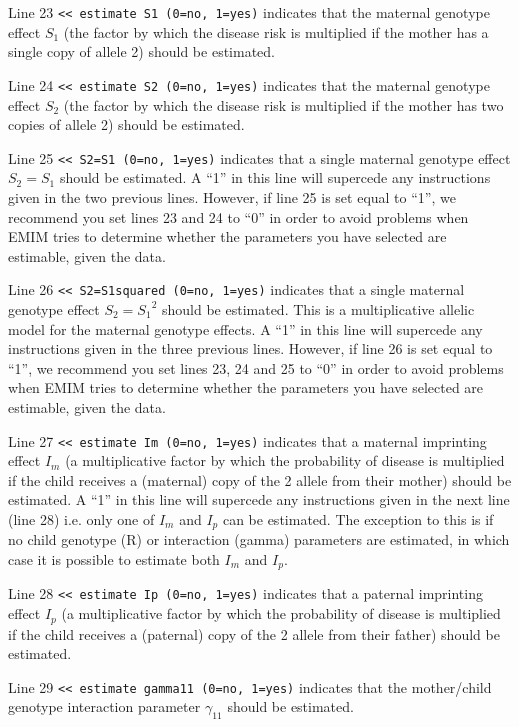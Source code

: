 \documentclass[a4paper,12pt]{article}
\newcommand{\code}[1]{{\footnotesize{{\tt #1}}}}
\begin{document}
Line 23 \code{<< estimate S1 (0=no, 1=yes)} indicates that the maternal genotype effect $S_1$ (the factor by which the disease risk is multiplied if the mother has a single copy of allele 2) should be estimated. 

Line 24 \code{<< estimate S2 (0=no, 1=yes)} indicates that the maternal genotype effect $S_2$ (the factor by which the disease risk is multiplied if the mother has two copies of allele 2) should be estimated. 

Line 25 \code{<< S2=S1 (0=no, 1=yes)} indicates that a single maternal genotype effect $S_2=S_1$ should be estimated. A ``1'' in this line will supercede any instructions given in the two previous lines. However, if line 25 is set equal to ``1'', we recommend you set lines 23 and 24 to ``0'' in order to avoid problems when EMIM tries to determine whether the parameters you have selected are estimable, given the data. 

Line 26 \code{<< S2=S1squared (0=no, 1=yes)} indicates that a single maternal genotype effect $S_2={S_1}^2$ should be estimated. This is a multiplicative allelic model for the maternal genotype effects. A ``1'' in this line will supercede any instructions given in the three previous lines. However, if line 26 is set equal to ``1'', we recommend you set lines 23, 24 and 25 to ``0'' in order to avoid problems when EMIM tries to determine whether the parameters you have selected are estimable, given the data. 

Line 27 \code{<< estimate Im (0=no, 1=yes)} indicates that a maternal imprinting effect $I_m$ (a multiplicative factor by which the probability of disease is multiplied if the child receives a (maternal) copy of the 2 allele from their mother) should be estimated. A ``1'' in this line will supercede any instructions given in the next line (line 28) i.e. only one of $I_m$ and $I_p$ can be estimated. The exception to this is if no child genotype (R) or interaction (gamma) parameters are estimated, in which case it is possible to estimate both $I_m$ and $I_p$. 

Line 28 \code{<< estimate Ip (0=no, 1=yes)} indicates that a paternal imprinting effect $I_p$ (a multiplicative factor by which the probability of disease is multiplied if the child receives a (paternal) copy of the 2 allele from their father) should be estimated. 

Line 29 \code{<< estimate gamma11 (0=no, 1=yes)} indicates that the mother/child genotype interaction parameter $\gamma_{11}$ should be estimated. 
\end{document}
